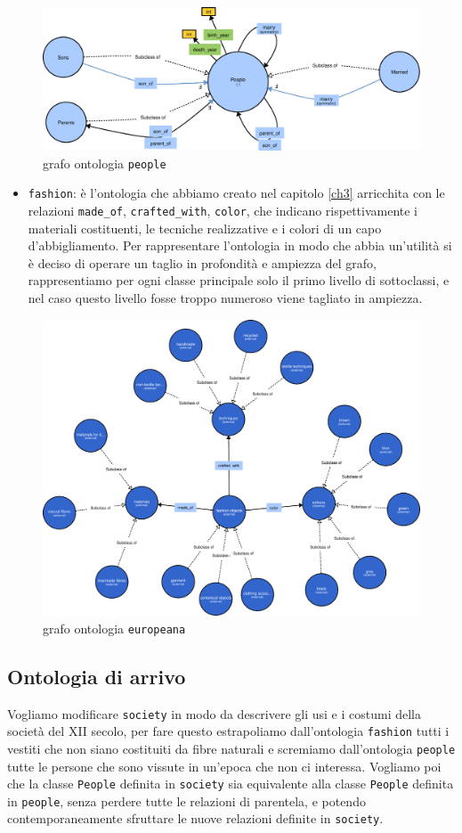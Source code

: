\begin{figure}[H]
	\centering
	\includegraphics[width=.9\textwidth]{Picture/people.2.pdf}
	\caption{grafo ontologia \texttt{people}}
\end{figure}
\label{ont_fashion}
\begin{itemize}
	\item \verb|fashion|: è l'ontologia che abbiamo creato nel capitolo \ref{ch3} arricchita con le relazioni \verb|made_of|, \verb|crafted_with|, \verb|color|, che indicano rispettivamente i materiali costituenti, le tecniche realizzative e i colori di un capo d'abbigliamento. Per rappresentare l'ontologia in modo che abbia un'utilità si è deciso di operare un taglio in profondità e ampiezza del grafo, rappresentiamo per ogni classe principale solo il primo livello di sottoclassi, e nel caso questo livello fosse troppo numeroso viene tagliato in ampiezza.
\end{itemize}
\begin{figure}[H]
	\centering	
	\includegraphics[width=.9\textwidth]{Picture/europeana_relation.pdf}
	\caption{\label{fig:ontEur}grafo ontologia \texttt{europeana}}
\end{figure}
\subsection{Ontologia di arrivo}
Vogliamo modificare \verb|society| in modo da descrivere gli usi e i costumi della società del XII secolo, per fare questo estrapoliamo dall'ontologia \verb|fashion| tutti i vestiti che non siano costituiti da fibre naturali e scremiamo dall'ontologia \verb|people| tutte le persone che sono vissute in un'epoca che non ci interessa. Vogliamo poi che la classe \verb|People| definita in \verb|society| sia equivalente alla classe \verb|People| definita in \verb|people|, senza perdere tutte le relazioni di parentela, e potendo contemporaneamente sfruttare le nuove relazioni definite in \verb|society|.
